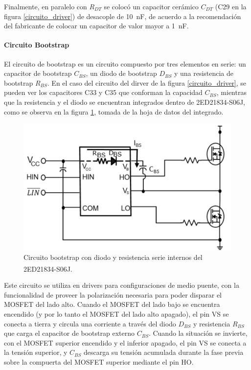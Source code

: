 Finalmente, en paralelo con $R_{DT}$ se colocó un capacitor cerámico $C_{DT}$ (C29 en la figura \ref{circuito_driver}) de desacople de \SI[]{10}{\nano\farad}, de acuerdo a la recomendación del fabricante de colocar un capacitor de valor mayor a \SI[]{1}{\nano\farad}.\\

\paragraph{Circuito Bootstrap}

El circuito de bootstrap es un circuito compuesto por tres elementos en serie: un capacitor de bootstrap $C_{BS}$, un diodo de bootstrap $D_{BS}$ y una resistencia de bootstrap $R_{BS}$. En el caso del circuito del dirver de la figura \ref{circuito_driver}, se pueden ver los capacitores C33 y C35 que conforman la capacidad $C_{BS}$, mientras que la resistencia y el diodo se encuentran integrados dentro de 2ED21834-S06J, como se observa en la figura \ref{circuito_bootstrap}, tomada de la hoja de datos del integrado.\\

\begin{figure}[h]
    \centering
    \includegraphics[scale=0.9]{Imagenes/Circuito Bootstrap.png}
    \caption{Circuito bootstrap con diodo y resistencia serie internos del 2ED21834-S06J.\textsuperscript{\cite{DatasheetDriver}}}
    \label{circuito_bootstrap}
\end{figure}

Este circuito se utiliza en drivers para configuraciones de medio puente, con la funcionalidad de proveer la polarización necesaria para poder disparar el MOSFET del lado alto. Cuando el MOSFET del lado bajo se encuentra encendido (y por lo tanto el MOSFET del lado alto apagado), el pin VS se conecta a tierra y circula una corriente a través del diodo $D_{BS}$ y resistencia $R_{BS}$ que carga el capacitor de bootstrap externo $C_{BS}$. Cuando la situación se invierte, con el MOSFET superior encendido y el inferior apagado, el pin VS se conecta a la tensión superior, y $C_{BS}$ descarga su tensión acumulada durante la fase previa sobre la compuerta del MOSFET superior mediante el pin HO.\\

